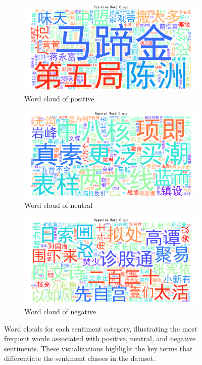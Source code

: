 \documentclass[12pt]{article}
\begin{document}
\begin{figure}[H]
	\centering
	\begin{subfigure}[b]{0.32\textwidth}
		\includegraphics[width=\linewidth]{wordcloud_positive.png}
		\caption{Word cloud of positive}
	\end{subfigure}
	\hfill
	\begin{subfigure}[b]{0.32\textwidth}
		\includegraphics[width=\linewidth]{wordcloud_neutral.png}
		\caption{Word cloud of neutral}
	\end{subfigure}
	\hfill
	\begin{subfigure}[b]{0.32\textwidth}
		\includegraphics[width=\linewidth]{wordcloud_negative.png}
		\caption{Word cloud of negative}
	\end{subfigure}
	\caption{Word clouds for each sentiment category, illustrating the most frequent words associated with positive, neutral, and negative sentiments. These visualizations highlight the key terms that differentiate the sentiment classes in the dataset.}
	\label{fig:wordclouds}
\end{figure}
\end{document}
